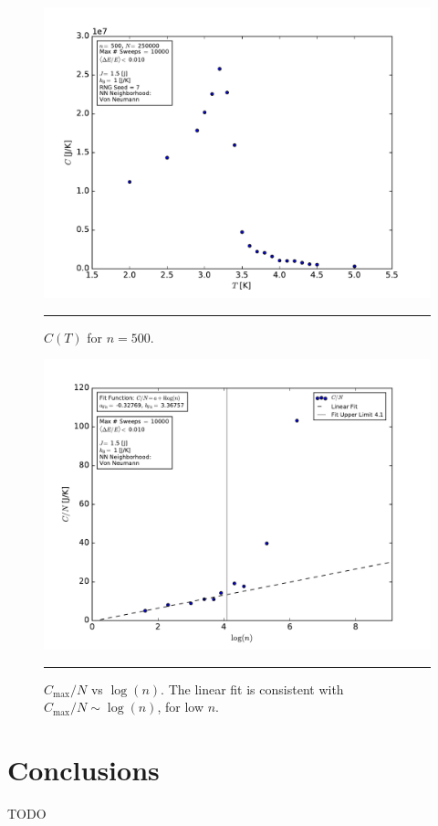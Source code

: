 \documentclass[notitlepage,aps,prd,nofootinbib]{revtex4-1}
\begin{document}
\begin{figure}[!htbc]
  \centering
  \includegraphics[width=.72\textwidth]{../output/plots_for_paper_von_neumann/part_b/CT_for_n500.pdf}
	{\par\nobreak\rule[9pt]{35em}{0.5pt}\vspace{-5mm}}
	\caption{$C\left(T\right)$ for $n=500$.}
	\label{fig:CT_n500}
\end{figure}


\begin{figure}[!htbc]
  \centering
  \includegraphics[width=.72\textwidth]{../output/plots_for_paper_von_neumann/part_b/Cmax_over_N_vs_n.pdf}
	{\par\nobreak\rule[9pt]{35em}{0.5pt}\vspace{-5mm}}
	\caption{$C_{\mathrm{max}}/N$ vs $\log(n)$. The linear fit is consistent with $C_{\mathrm{max}}/N \sim \log(n)$, for low $n$.}
	\label{fig:Cmax_over_N_vs_n}
\end{figure}



\clearpage
\section{Conclusions}
\label{sec:Conclusions}
TODO
\end{document}
